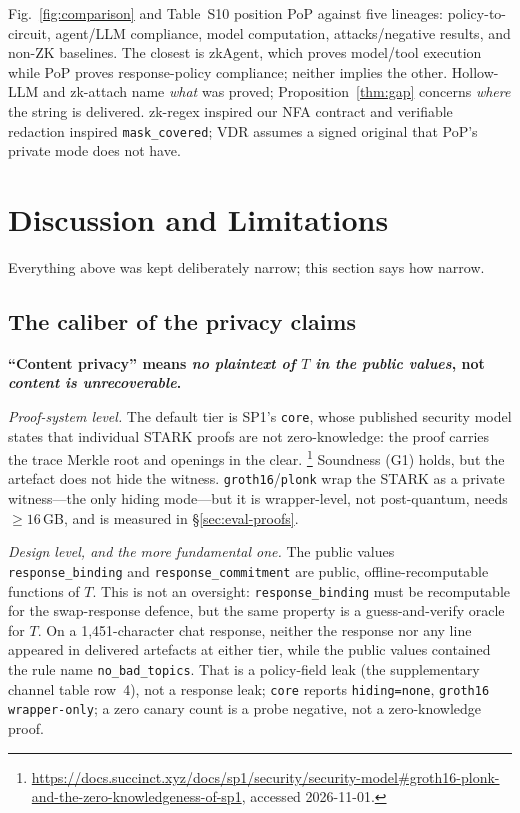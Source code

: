 \documentclass[10pt,journal,compsoc]{IEEEtran}
\begin{document}
Fig.~\ref{fig:comparison} and Table~S10 position PoP against five lineages:
policy-to-circuit, agent/LLM compliance, model computation, attacks/negative
results, and non-ZK baselines. The closest is zkAgent, which proves model/tool
execution while PoP proves response-policy compliance; neither implies the
other. Hollow-LLM and zk-attach name \emph{what} was proved;
Proposition~\ref{thm:gap} concerns \emph{where} the string is delivered.
zk-regex inspired our NFA contract and verifiable redaction \cite{vdr} inspired
\texttt{mask\_covered}; VDR assumes a signed original that PoP's private mode
does not have.

\section{Discussion and Limitations}
\label{sec:discussion}

Everything above was kept deliberately narrow; this section says how narrow.

\subsection{The caliber of the privacy claims}
\label{sec:disc-privacy}
\label{sec:disc-policy}

\textbf{``Content privacy'' means \emph{no plaintext of $T$ in the public
values}, not \emph{content is unrecoverable}.}

\emph{Proof-system level.} The default tier is SP1's \texttt{core}, whose
published security model states that individual STARK proofs are not
zero-knowledge: the proof carries the trace Merkle root and openings in the
clear.%
\footnote{\url{https://docs.succinct.xyz/docs/sp1/security/security-model\#groth16-plonk-and-the-zero-knowledgeness-of-sp1}, accessed 2026-11-01.}
Soundness (G1) holds, but the artefact does not hide the witness.
\texttt{gr\-oth16}/\texttt{plonk} wrap the STARK as a private witness---the only
hiding mode---but it is wrapper-level, not post-quantum, needs $\ge16$\,GB, and
is measured in \S\ref{sec:eval-proofs}.

\emph{Design level, and the more fundamental one.} The public values
\texttt{response\_binding} and \texttt{response\_commitment} are public,
offline-recomputable functions of $T$. This is not an oversight:
\texttt{response\_binding} must be recomputable for the swap-response defence,
but the same property is a guess-and-verify oracle for $T$. On a
1{,}451-character chat response, neither the response nor any line appeared in
delivered artefacts at either tier, while the public values contained the rule
name \texttt{no\_bad\_topics}. That is a policy-field leak
(the supplementary channel table row~4), not a response leak; \texttt{core} reports
\texttt{hiding=none}, \texttt{gr\-oth16} \texttt{wrapper-only}; a zero canary
count is a probe negative, not a zero-knowledge proof.
\end{document}
